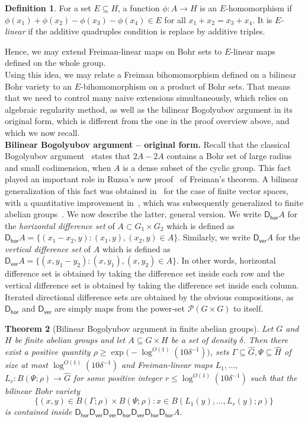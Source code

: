 \documentclass[a4paper,11pt]{article}
\newtheorem{theorem}{Theorem}
\numberwithin{theorem}{section}
\theoremstyle{definition}
\newtheorem{defin}[theorem]{Definition}
\newcommand{\dhor}{\mathsf{D}_{\mathsf{hor}}}
\newcommand{\dver}{\mathsf{D}_{\mathsf{ver}}}
\begin{document}
\begin{defin}
    For a set $E \subseteq H$, a function $\phi : A \to H$ is an $E$-homomorphism if $\phi(x_1) + \phi(x_2) - \phi(x_3) - \phi(x_4) \in E$ for all $x_1 + x_2 = x_3 + x_4$. It is \textit{$E$-linear} if the additive quadruples condition is replace by additive triples.
\end{defin}

Hence, we may extend Freiman-linear maps on Bohr sets to $E$-linear maps defined on the whole group.\\

Using this idea, we may relate a Freiman bihomomorphism defined on a bilinear Bohr variety to an $E$-bihomomorphism on a product of Bohr sets. That means that we need to control many naive extensions simultaneously, which relies on algebraic regularity method, as well as the bilinear Bogolyubov argument in its original form, which is different from the one in the proof overview above, and which we now recall.\\

\noindent\textbf{Bilinear Bogolyubov argument -- original form.} Recall that the classical Bogolyubov argument~\cite{bogoriginal} states that $2A - 2A$ contains a Bohr set of large radius and small codimension, when $A$  is a dense subset of the cyclic group. This fact played an important role in Ruzsa's new proof~\cite{ruzsafreimanproof} of Freiman's theorem. A bilinear generalization of this fact was obtained in~\cite{BienvenuLe, BilinearBog} for the case of finite vector spaces, with a quantitative improvement in~\cite{HosseiniLovett}, which was subsequently generalized to finite abelian groups~\cite{generalBilBog}. We now describe the latter, general version. We write $\dhor A$ for the \emph{horizontal difference set} of $A \subset G_1\times G_2$ which is defined as $\dhor A = \{(x_1 - x_2, y) \colon (x_1, y), (x_2, y) \in A\}$. Similarly, we write $\dver A$ for the \emph{vertical difference set} of $A$ which is defined as $\dver A = \{(x, y_1 - y_2) \colon (x, y_1), (x, y_2) \in A\}$. In other words, horizontal difference set is obtained by taking the difference set inside each row and the vertical difference set is obtained by taking the difference set inside each column. Iterated directional difference sets are obtained by the obvious compositions, as $\dhor$ and $\dver$ are simply maps from the power-set $\mathcal{P}(G \times G)$ to itself.

\begin{theorem}[Bilinear Bogolyubov argument in finite abelian groups]\label{bogruzsabilinearintro}Let $G$ and $H$ be finite abelian groups and let $A \subseteq G \times H$ be a set of density $\delta$. Then there exist a positive quantity $\rho \geq \exp\Big(-\log^{O(1)} (10 \delta^{-1})\Big)$, sets $\Gamma \subseteq \hat{G},  \Psi \subseteq \hat{H}$ of size at most $\log^{O(1)} (10\delta^{-1})$ and Freiman-linear maps $L_1, \dots,$ $L_r \colon B(\Psi; \rho) \to \hat{G}$ for some positive integer $r \leq \log^{O(1)} (10 \delta^{-1})$ such that the bilinear Bohr variety
\[\Big\{(x,y) \in B(\Gamma; \rho) \times B(\Psi; \rho) \colon x \in B(L_1(y), \dots, L_r(y); \rho) \Big\}\]
is contained inside $\dhor\dver \dver \dhor \dver \dhor \dhor A$.\end{theorem}
\end{document}
